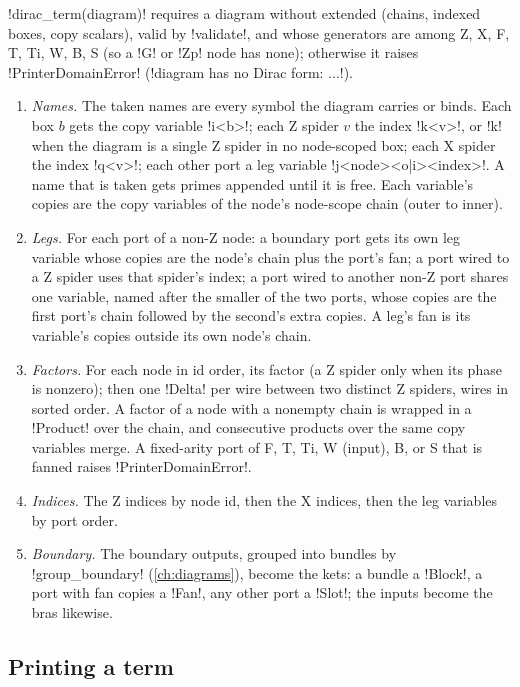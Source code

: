 \begin{algorithm}\label{alg:language-term}
\leavevmode
\py!dirac_term(diagram)! requires a diagram without extended \bboxes{} (chains, indexed boxes, copy scalars), valid by \py!validate!, and whose generators are among Z, X, F, T, Ti, W, B, S (so a \code!G! or \code!Zp! node has none); otherwise it raises \py!PrinterDomainError! (\code!diagram has no Dirac form: ...!).
\begin{enumerate}
\item \emph{Names.} The taken names are every symbol the diagram carries or binds. Each box $b$ gets the copy variable \code!i<b>!; each Z spider $v$ the index \code!k<v>!, or \code!k! when the diagram is a single Z spider in no node-scoped box; each X spider the index \code!q<v>!; each other port a leg variable \code!j<node><o|i><index>!. A name that is taken gets primes appended until it is free. Each variable's copies are the copy variables of the node's node-scope chain (outer to inner).
\item \emph{Legs.} For each port of a non-Z node: a boundary port gets its own leg variable whose copies are the node's chain plus the port's fan; a port wired to a Z spider uses that spider's index; a port wired to another non-Z port shares one variable, named after the smaller of the two ports, whose copies are the first port's chain followed by the second's extra copies. A leg's fan is its variable's copies outside its own node's chain.
\item \emph{Factors.} For each node in id order, its factor (a Z spider only when its phase is nonzero); then one \py!Delta! per wire between two distinct Z spiders, wires in sorted order. A factor of a node with a nonempty chain is wrapped in a \py!Product! over the chain, and consecutive products over the same copy variables merge. A fixed-arity port of F, T, Ti, W (input), B, or S that is fanned raises \py!PrinterDomainError!.
\item \emph{Indices.} The Z indices by node id, then the X indices, then the leg variables by port order.
\item \emph{Boundary.} The boundary outputs, grouped into bundles by \py!group_boundary! (\cref{ch:diagrams}), become the kets: a bundle a \py!Block!, a port with fan copies a \py!Fan!, any other port a \py!Slot!; the inputs become the bras likewise.
\end{enumerate}
\end{algorithm}

\subsection{Printing a term}

